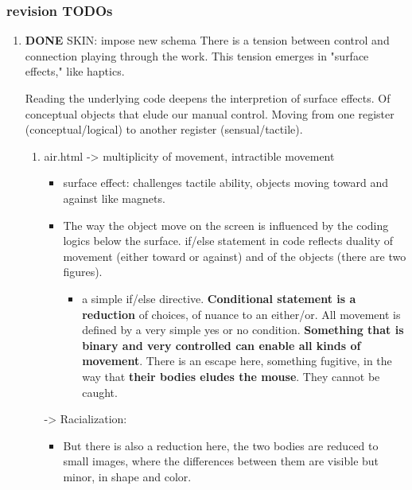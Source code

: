 \documentclass[11pt]{article}
\begin{document}
\subsubsection{revision TODOs}
\label{sec:org36e962a}
\begin{enumerate}
\item {\bfseries\sffamily DONE} SKIN: impose new schema
\label{sec:orgf77a27e}
There is a tension between control and connection playing through the
work. This tension emerges in "surface effects," like haptics. 

Reading the underlying code deepens the interpretion of surface
effects. Of conceptual objects that elude our manual control. Moving
from one register (conceptual/logical) to another register
(sensual/tactile).

\begin{enumerate}
\item air.html -> multiplicity of movement, intractible movement
\label{sec:orgc1eadba}
\begin{itemize}
\item surface effect: challenges tactile ability, objects moving toward
and against like magnets.
\item The way the object move on the screen is influenced by the coding
logics below the surface. if/else statement in code reflects duality
of movement (either toward or against) and of the objects (there are
two figures).
\begin{itemize}
\item a simple if/else directive. \textbf{Conditional statement is a reduction}
of choices, of nuance to an either/or. All movement is defined by
a very simple yes or no condition. \textbf{Something that is binary and
very controlled can enable all kinds of movement}. There is an
escape here, something fugitive, in the way that \textbf{their bodies
eludes the mouse}. They cannot be caught.
\end{itemize}
\end{itemize}
-> Racialization: 
\begin{itemize}
\item But there is also a reduction here, the two bodies are reduced to
small images, where the differences between them are visible but
minor, in shape and color.
\end{itemize}


\end{enumerate}
\end{enumerate}
\end{document}
